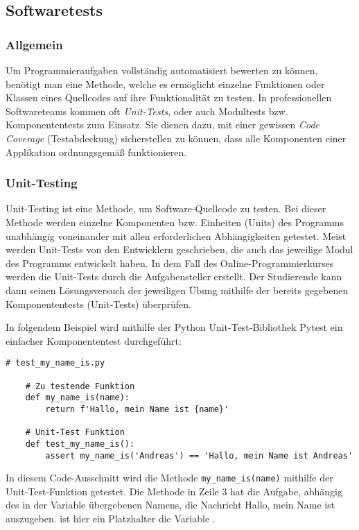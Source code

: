 \subsection{Softwaretests}
\subsubsection{Allgemein}
Um Programmieraufgaben vollständig automatisiert bewerten zu können, benötigt
man eine Methode, welche es ermöglicht einzelne Funktionen oder Klassen eines
Quellcodes auf ihre Funktionalität zu testen. In professionellen Softwareteams
kommen oft \emph{Unit-Tests}, oder auch Modultests bzw. Komponententests zum
Einsatz. Sie dienen dazu, mit einer gewissen \emph{Code Coverage}
(Testabdeckung) sicherstellen zu können, dass alle Komponenten einer Applikation
ordnungsgemäß funktionieren.

\subsubsection{Unit-Testing}\label{unit-tests}
Unit-Testing ist eine Methode, um Software-Quellcode zu testen. Bei dieser
Methode werden einzelne Komponenten bzw. Einheiten (Units) des Programms
unabhängig voneinander mit allen erforderlichen Abhängigkeiten getestet. Meist
werden Unit-Tests von den Entwicklern geschrieben, die auch das jeweilige
Modul des Programms entwickelt haben. In dem Fall des Online-Programmierkurses
werden die Unit-Tests durch die Aufgabensteller erstellt. Der Studierende kann
dann seinen Lösungsversuch der jeweiligen Übung mithilfe der bereits gegebenen
Komponententests (Unit-Tests) überprüfen. \parencite{unit-test}

In folgendem Beispiel wird mithilfe der Python Unit-Test-Bibliothek Pytest
ein einfacher Komponententest durchgeführt:

\begin{lstlisting}[style=Python]
    # test_my_name_is.py

    # Zu testende Funktion
    def my_name_is(name):
        return f'Hallo, mein Name ist {name}'

    # Unit-Test Funktion
    def test_my_name_is():
        assert my_name_is('Andreas') == 'Hallo, mein Name ist Andreas'
\end{lstlisting}

In diesem Code-Ausschnitt wird die Methode \texttt{my\_name\_is(name)} mithilfe
der Unit-Test-Funktion  getestet. Die Methode 
 in Zeile 3 hat die Aufgabe, abhängig des in der
Variable  übergebenen Namens, die Nachricht \glqq Hallo, mein Name
ist \grqq{} auszugeben.  ist hier ein Platzhalter
die Variable .

